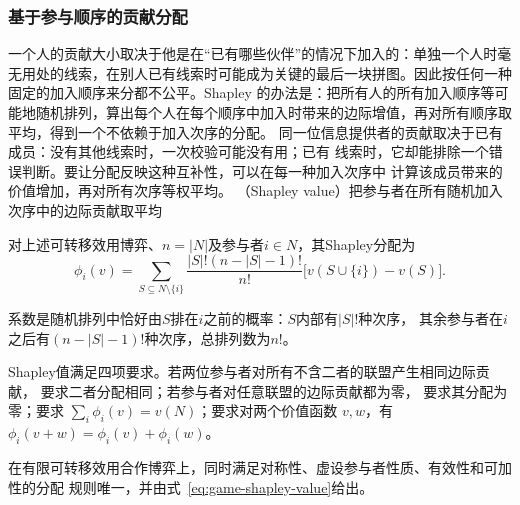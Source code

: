 \subsubsection{基于参与顺序的贡献分配}
\label{sec:game-shapley-order}

一个人的贡献大小取决于他是在“已有哪些伙伴”的情况下加入的：单独一个人时毫无用处的线索，在别人已有线索时可能成为关键的最后一块拼图。因此按任何一种固定的加入顺序来分都不公平。Shapley 的办法是：把所有人的所有加入顺序等可能地随机排列，算出每个人在每个顺序中加入时带来的边际增值，再对所有顺序取平均，得到一个不依赖于加入次序的分配。
同一位信息提供者的贡献取决于已有成员：没有其他线索时，一次校验可能没有用；已有
线索时，它却能排除一个错误判断。要让分配反映这种互补性，可以在每一种加入次序中
计算该成员带来的价值增加，再对所有次序等权平均。
（Shapley value）把参与者在所有随机加入次序中的边际贡献取平均
\begin{definition}[Shapley值]
\label{def:game-shapley-value}
对上述可转移效用博弈、\(n=|N|\)及参与者$i\in N$，其Shapley分配为
\begin{equation}
  \phi_i(v)
  =
  \sum_{S\subseteq N\setminus\{i\}}
  \frac{|S|!(n-|S|-1)!}{n!}
  \bigl[
    v(S\cup\{i\})-v(S)
  \bigr].
  \label{eq:game-shapley-value}
\end{equation}
\end{definition}
系数是随机排列中恰好由\(S\)排在\(i\)之前的概率：\(S\)内部有\(|S|!\)种次序，
其余参与者在\(i\)之后有\((n-|S|-1)!\)种次序，总排列数为\(n!\)。

Shapley值满足四项要求。若两位参与者对所有不含二者的联盟产生相同边际贡献，
要求二者分配相同；若参与者对任意联盟的边际贡献都为零，
要求其分配为零；要求
\(\sum_i\phi_i(v)=v(N)\)；要求对两个价值函数
\(v,w\)，有\(\phi_i(v+w)=\phi_i(v)+\phi_i(w)\)。

\begin{theorem}[Shapley值的公理刻画]
\label{thm:game-shapley-characterization}
在有限可转移效用合作博弈上，同时满足对称性、虚设参与者性质、有效性和可加性的分配
规则唯一，并由式~\eqref{eq:game-shapley-value}给出。
\end{theorem}

